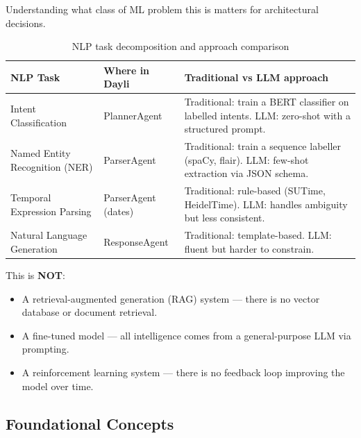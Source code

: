 \documentclass[12pt, a4paper]{article}
\begin{document}
Understanding what class of ML problem this is matters for architectural decisions.

\begin{table}[htbp]
\centering
\renewcommand{\arraystretch}{1.4}
\begin{tabularx}{\textwidth}{L{3.5cm} L{4.0cm} X}
\toprule
\textbf{NLP Task} & \textbf{Where in Dayli} & \textbf{Traditional vs LLM approach} \\
\midrule
Intent Classification
  & PlannerAgent
  & Traditional: train a BERT classifier on labelled intents. LLM: zero-shot with a structured prompt. \\
Named Entity Recognition (NER)
  & ParserAgent
  & Traditional: train a sequence labeller (spaCy, flair). LLM: few-shot extraction via JSON schema. \\
Temporal Expression Parsing
  & ParserAgent (dates)
  & Traditional: rule-based (SUTime, HeidelTime). LLM: handles ambiguity but less consistent. \\
Natural Language Generation
  & ResponseAgent
  & Traditional: template-based. LLM: fluent but harder to constrain. \\
\bottomrule
\end{tabularx}
\caption{NLP task decomposition and approach comparison}
\end{table}

\noindent This is \textbf{NOT}:
\begin{itemize}
  \item A retrieval-augmented generation (RAG) system --- there is no vector database or document retrieval.
  \item A fine-tuned model --- all intelligence comes from a general-purpose LLM via prompting.
  \item A reinforcement learning system --- there is no feedback loop improving the model over time.
\end{itemize}

\subsection{Foundational Concepts}
\end{document}
